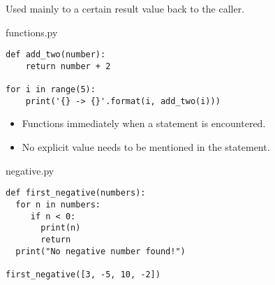 \documentclass[aspectratio=1610,slidestop]{beamer}
\begin{document}
\begin{pframe}
 Used mainly to  a certain result value back to the caller.
 \medskip

 \begin{minipage}[t]{0.60\textwidth}
  \begin{pythonfile}{functions.py}
   \begin{verbatim}
def add_two(number):
    return number + 2

for i in range(5):
    print('{} -> {}'.format(i, add_two(i)))
   \end{verbatim}
  \end{pythonfile}
 \end{minipage}\qquad
 \pause
 \begin{minipage}[t]{0.35\textwidth}
 \vspace{-3.05cm}
 \begin{terminal}
 \end{terminal}
 \end{minipage}
\end{pframe}


\begin{pframe}
 \begin{itemize}
  \item Functions immediately  when a  statement is encountered.
  \item No explicit value needs to be mentioned in the  statement.
 \end{itemize}
 \pause
 \medskip

 \begin{minipage}[t]{0.49\textwidth}
  \begin{pythonfile}{negative.py}
   \begin{verbatim}
def first_negative(numbers):
  for n in numbers:
     if n < 0:
       print(n)
       return
  print("No negative number found!")

first_negative([3, -5, 10, -2])
   \end{verbatim}
  \end{pythonfile}
 \end{minipage}\qquad
 \pause
 \begin{minipage}[t]{0.45\textwidth}
 \vspace{-4.15cm}
 \begin{terminal}
 \end{terminal}
 \end{minipage}
\end{pframe}
\end{document}
